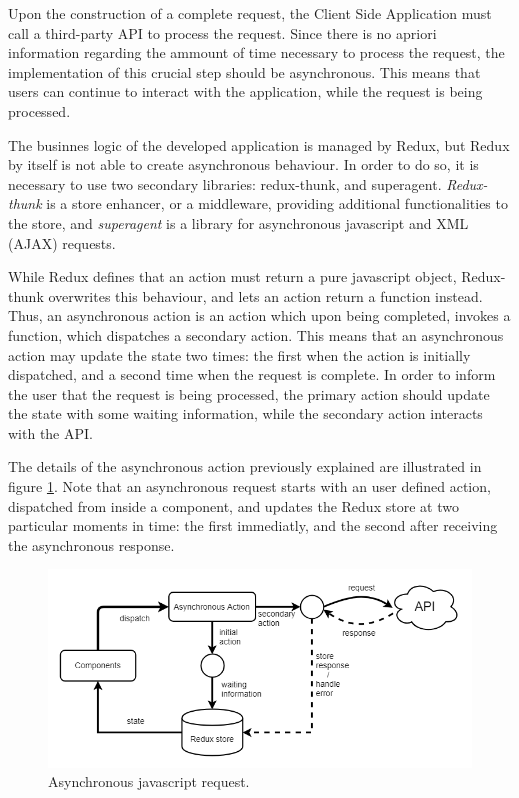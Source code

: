 Upon the construction of a complete request, the Client Side Application 
must call a third-party API to process the request. Since there 
is no apriori information regarding the ammount of time necessary to process the request,
the implementation of this crucial step should be asynchronous.
This means that users can continue to interact with the application, while the request is being processed.

The businnes logic of the developed application is managed by Redux, but Redux by itself is not able
to create asynchronous behaviour. In order to do so, it is necessary to use two secondary libraries:
redux-thunk, and superagent. \textit{Redux-thunk} is a store enhancer, or a middleware,
providing additional functionalities to the store,
and \textit{superagent} is a library for asynchronous javascript and XML (AJAX) requests.

While Redux defines that an action must return a pure javascript object, Redux-thunk overwrites this behaviour,
and lets an action return a function instead. Thus, an asynchronous action 
is an action which upon being completed, invokes a function, which dispatches a secondary action.
This means that an asynchronous action may update the state two times: the first when the action is initially dispatched,
and a second time when the request is complete.
In order to inform the user that the request is being processed, the primary action should 
update the state with some waiting information, while the secondary action interacts with the API.

The details of the asynchronous action previously explained are illustrated in figure \ref{fig:ajax_request}.
Note that an asynchronous request starts with an user defined action, dispatched from inside a component,
and updates the Redux store at two particular moments in time: the first immediatly, and the second after receiving the asynchronous response.

\begin{figure}[htpb]
  \centering
  \includegraphics[width=\textwidth]{./Figures/system_implementation/async_request.png}
  \caption{Asynchronous javascript request.}
  \label{fig:ajax_request}  
\end{figure}

